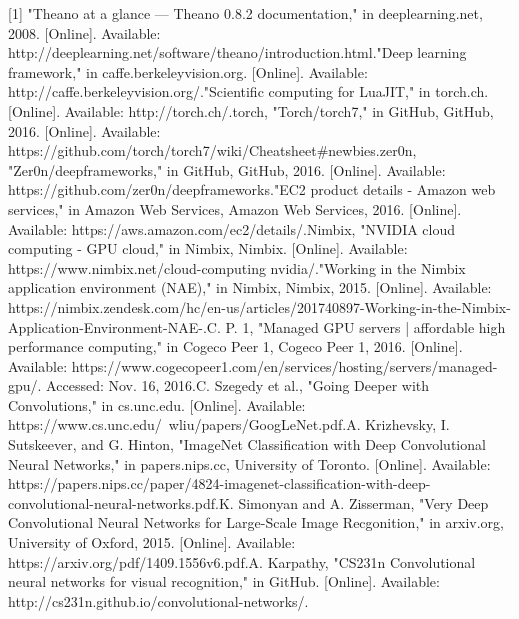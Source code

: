 [1] "Theano at a glance — Theano 0.8.2 documentation," in deeplearning.net, 2008. [Online]. Available: http://deeplearning.net/software/theano/introduction.html.\newline
[2] "Deep learning framework," in caffe.berkeleyvision.org. [Online]. Available: http://caffe.berkeleyvision.org/.\newline
[3] "Scientific computing for LuaJIT," in torch.ch. [Online]. Available: http://torch.ch/.\newline
[4] 	torch, "Torch/torch7," in GitHub, GitHub, 2016. [Online]. Available: https://github.com/torch/torch7/wiki/Cheatsheet\#newbies.\newline
[5] zer0n, "Zer0n/deepframeworks," in GitHub, GitHub, 2016. [Online]. Available: https://github.com/zer0n/deepframeworks.\newline
[6] "EC2 product details - Amazon web services," in Amazon Web Services, Amazon Web Services, 2016. [Online]. Available: https://aws.amazon.com/ec2/details/.\newline
[7] Nimbix, "NVIDIA cloud computing - GPU cloud," in Nimbix, Nimbix. [Online]. Available: https://www.nimbix.net/cloud-computing nvidia/.\newline
[8] "Working in the Nimbix application environment (NAE)," in Nimbix, Nimbix, 2015. [Online]. Available: https://nimbix.zendesk.com/hc/en-us/articles/201740897-Working-in-the-Nimbix-Application-Environment-NAE-.\newline
[9] C. P. 1, "Managed GPU servers | affordable high performance computing," in Cogeco Peer 1, Cogeco Peer 1, 2016. [Online]. Available: https://www.cogecopeer1.com/en/services/hosting/servers/managed-gpu/. Accessed: Nov. 16, 2016.\newline
[10] C. Szegedy et al., "Going Deeper with Convolutions," in cs.unc.edu. [Online]. Available: https://www.cs.unc.edu/~wliu/papers/GoogLeNet.pdf.\newline
[11] A. Krizhevsky, I. Sutskeever, and G. Hinton, "ImageNet Classification with Deep Convolutional Neural Networks," in papers.nips.cc, University of Toronto. [Online]. Available: https://papers.nips.cc/paper/4824-imagenet-classification-with-deep-convolutional-neural-networks.pdf.\newline
[12] K. Simonyan and A. Zisserman, "Very Deep Convolutional Neural Networks for Large-Scale Image Recgonition," in arxiv.org, University of Oxford, 2015. [Online]. Available: https://arxiv.org/pdf/1409.1556v6.pdf.\newline
[13] A. Karpathy, "CS231n Convolutional neural networks for visual recognition," in GitHub. [Online]. Available: http://cs231n.github.io/convolutional-networks/.\newline
